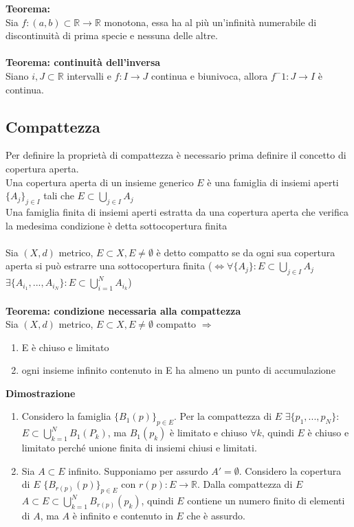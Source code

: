 \documentclass{article}
\begin{document}
\textbf{Teorema:}\\
Sia $f:(a,b)\subset\mathds{R}\rightarrow\mathds{R}$ monotona, essa ha al più un'infinità numerabile di discontinuità di prima specie e nessuna delle altre.\\\\
\textbf{Teorema: continuità dell'inversa}\\
Siano $i,J\subset\mathds{R}$ intervalli e $f:I\rightarrow J$ continua e biunivoca, allora $f^-1:J\rightarrow I$ è continua.

\subsection{Compattezza}
Per definire la proprietà di compattezza è necessario prima definire il concetto di copertura aperta.\\
Una copertura aperta di un insieme generico $E$ è una famiglia di insiemi aperti $\{A_j\}_{j\in I}$ tali che $E\subset\bigcup_{j\in I}A_j$\\
Una famiglia finita di insiemi aperti estratta da una copertura aperta che verifica la medesima condizione è detta sottocopertura finita\\\\
Sia $(X,d)$ metrico, $E\subset X,E\neq\emptyset$ è detto compatto se da ogni sua copertura aperta si può estrarre una sottocopertura finita ($\Leftrightarrow\forall\{A_j\}:E\subset\bigcup_{j\in I}A_j$ $\exists\{A_{i_1},...,A_{i_N}\}:E\subset\bigcup_{i=1}^{N}A_{i_k}$)\\\\
\textbf{Teorema: condizione necessaria alla compattezza}\\
Sia $(X,d)$ metrico, $E\subset X,E\neq\emptyset$ compatto $\Rightarrow$ \begin{enumerate}
    \item E è chiuso e limitato
    \item ogni insieme infinito contenuto in E ha almeno un punto di accumulazione
\end{enumerate}
\textbf{Dimostrazione}
\begin{enumerate}
    \item Considero la famiglia $\{B_1(p)\}_{p\in E}$. Per la compattezza di $E$ $\exists\{p_1,...,p_N\}:$ $E\subset \bigcup_{k=1}^NB_1(P_k)$, ma $B_1(p_k)$ è limitato e chiuso $\forall k$, quindi $E$ è chiuso e limitato perché unione finita di insiemi chiusi e limitati.
    
    \item Sia $A\subset E$ infinito. Supponiamo per assurdo $A'=\emptyset$. Considero la copertura di $E$ $\{B_{r(p)}(p)\}_{p\in E}$ con $r(p): E\rightarrow\mathds{R}$. Dalla compattezza di $E$ $A\subset E\subset\bigcup_{k=1}^NB_{r(p)}(p_k)$, quindi $E$ contiene un numero finito di elementi di $A$, ma $A$ è infinito e contenuto in $E$ che è assurdo.
\end{enumerate}
\end{document}
